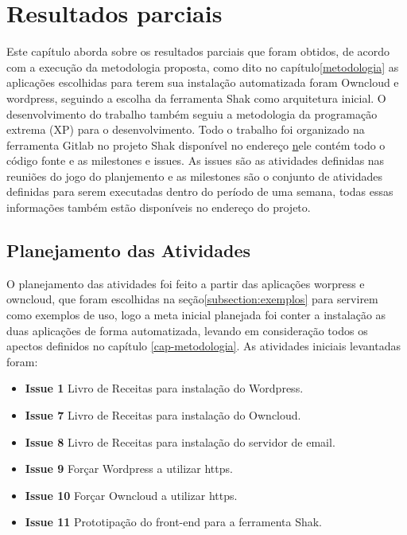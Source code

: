 \chapter{Resultados parciais}
\label{cap-resultados}


Este capítulo aborda sobre os resultados parciais que foram obtidos, de acordo
com a execução da metodologia proposta, como dito no capítulo\ref{metodologia}
as aplicações escolhidas para terem sua instalação automatizada foram Owncloud e
wordpress, seguindo a escolha da ferramenta Shak como arquitetura inicial. O
desenvolvimento do trabalho também seguiu a metodologia da programação extrema
(XP) para o desenvolvimento. Todo o trabalho foi organizado na ferramenta Gitlab
no projeto Shak disponível no endereço \href{https://gitlab.com/shak/shak/} nele
contém todo o código fonte e as milestones e issues. As issues são as atividades
definidas nas reuniões do jogo do planjemento e as milestones são o conjunto de
atividades definidas para serem executadas dentro do período de uma semana, todas
essas informações também estão disponíveis no endereço do projeto.

\section{Planejamento das Atividades}

O planejamento das atividades foi feito a partir das aplicações worpress e owncloud,
que foram escolhidas na seção\ref{subsection:exemplos} para servirem como exemplos
de uso, logo a meta inicial planejada foi conter a instalação as duas aplicações
de forma automatizada, levando em consideração todos os apectos definidos no capítulo
\ref{cap-metodologia}. As atividades iniciais levantadas foram:

 \begin{itemize}
   \item \textbf{Issue 1} Livro de Receitas para instalação do Wordpress.
   \item \textbf{Issue 7} Livro de Receitas para instalação do Owncloud.
   \item \textbf{Issue 8} Livro de Receitas para instalação do servidor de email.
   \item \textbf{Issue 9} Forçar Wordpress a utilizar https.
   \item \textbf{Issue 10} Forçar Owncloud a utilizar https.
   \item \textbf{Issue 11} Prototipação do front-end para a ferramenta Shak.
 \end{itemize}

